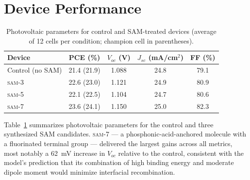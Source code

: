 \section{Device Performance}

\begin{table}[htbp]
\centering
\caption{Photovoltaic parameters for control and SAM-treated devices
(average of 12 cells per condition; champion cell in parentheses).}
\label{tab:device-results}
\begin{tabular}{@{}lcccc@{}}
\toprule
\textbf{Device} & \textbf{PCE (\%)} & $V_{oc}$ \textbf{(V)} & $J_{sc}$ \textbf{(mA/cm}$^2$\textbf{)} & \textbf{FF (\%)} \\
\midrule
Control (no SAM) & 21.4 (21.9) & 1.088 & 24.8 & 79.1 \\
\textsc{sam-3} & 22.6 (23.0) & 1.121 & 24.9 & 80.9 \\
\textsc{sam-5} & 22.1 (22.5) & 1.104 & 24.7 & 80.6 \\
\textsc{sam-7} & 23.6 (24.1) & 1.150 & 25.0 & 82.3 \\
\bottomrule
\end{tabular}
\end{table}

Table~\ref{tab:device-results} summarizes photovoltaic parameters for the
control and three synthesized SAM candidates. \textsc{sam-7} --- a
phosphonic-acid-anchored molecule with a fluorinated terminal group ---
delivered the largest gains across all metrics, most notably a 62~mV
increase in $V_{oc}$ relative to the control, consistent with the
model's prediction that its combination of high binding energy and
moderate dipole moment would minimize interfacial recombination.
